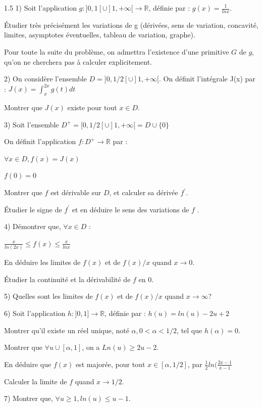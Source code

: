 \documentclass[12pt]{article}
\begin{document}
\begin{spacing}{1.5}
1) Soit l'application $g : ]0,1[\cup ]1,+\infty[\longrightarrow \mathbb{R}$, définie par : 
$g(x)=\frac{1}{lnx}$.
 
 Étudier très précisément les variations de g (dérivées, sens de variation, concavité, limites, 
asymptotes éventuelles, tableau de variation, graphe). 

Pour toute la suite du problème, on admettra l'existence d'une primitive $G$ de $g$, qu'on ne 
cherchera pas à calculer explicitement. 
 
2) On considère l'ensemble $D = ]0,1/2[\cup ]1,+\infty[$. 
On définit l'intégrale J(x) par : 
$J(x) =\int_{x}^{2x}g(t)dt$

Montrer que $J(x)$ existe pour tout $x\in D$. 

3) Soit l'ensemble $D^+ = [0,1/2[\cup ]1,+\infty[ = D \cup \lbrace 0\rbrace$

On définit l'application $f : D^+\longrightarrow \mathbb{R}$ par : 

$\forall x \in D,f(x) = J(x)$

$f(0)=0$

Montrer que $f$ est dérivable sur $D$, et calculer sa dérivée $f^{\prime}$.

Étudier le signe de $f^{\prime}$ et en déduire le sens des variations de $f$ . 

4) Démontrer que, $\forall x \in D$ : 

$\frac{x}{ln(2x)}\leq f(x)\leq \frac{x}{lnx}$

En déduire les limites de $f(x)$ et de $f(x) /x$ quand $x \longrightarrow 0$. 

Étudier la continuité et la dérivabilité de $f$ en $0$. 

5) Quelles sont les limites de $f(x)$ et de $f(x)/x$ quand $x\longrightarrow \infty$? 

6) Soit l'application $h : ]0,1] \longrightarrow \mathbb{R}$, définie par : 
$h(u) = ln(u)-2u + 2$ 

Montrer qu'il existe un réel unique, noté $\alpha, 0 < \alpha  <1/2$, tel que $h(\alpha) = 0$. 

Montrer que $\forall u \cup [\alpha, 1]$, on a $Ln(u)\geq 2u-2$. 

En déduire que $f(x)$ est majorée, pour tout $x\in[\alpha,1/2]$, par $\frac{1}{2}ln(\frac{2x-1}{x-1}$

Calculer la limite de $f$ quand  $x \longrightarrow 1/2$. 

7) Montrer que, $\forall u\geq 1, ln(u) \leq u - 1$. 


\end{spacing}
\end{document}
